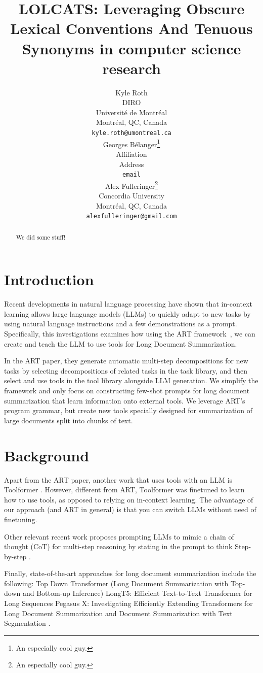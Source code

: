 \documentclass{article}
\title{LOLCATS: Leveraging Obscure Lexical Conventions And Tenuous Synonyms in computer science research}
\author{%
  Kyle Roth \\
  DIRO \\
  Université de Montréal \\
  Montréal, QC, Canada \\
  \texttt{kyle.roth@umontreal.ca} \\
  \And
  Georges Bélanger\thanks{An especially cool guy.} \\
  Affiliation \\
  Address \\
  \texttt{email} \\
  \And
  Alex Fulleringer\thanks{An especially cool guy.} \\
  Concordia University \\
  Montréal, QC, Canada \\
  \texttt{alexfulleringer@gmail.com} \\
}
\begin{document}
\maketitle


\begin{abstract}
  We did some stuff!
\end{abstract}


\section{Introduction}
Recent developments in natural language processing have shown that in-context learning allows large language models (LLMs) to quickly adapt to new tasks by using natural language instructions and a few demonstrations as a prompt.
Specifically, this investigations examines how using the ART framework~\cite{paranjape2023art}, we can create and teach the LLM to use tools for Long Document Summarization.

In the ART paper, they generate automatic multi-step decompositions for new tasks by selecting decompositions of related tasks in the task library, and then select and use tools in the tool library alongside LLM generation.
We simplify the framework and only focus on constructing few-shot prompts for long document summarization that learn information onto external tools. We leverage ART's program grammar, but create new tools specially designed for summarization of large documents split into chunks of text.


\section{Background}
Apart from the ART paper, another work that uses tools with an LLM is Toolformer .
However, different from ART, Toolformer was finetuned to learn how to use tools, as opposed to relying on in-context learning. The advantage of our approach (and ART in general) is that you can switch LLMs without need of finetuning.

Other relevant recent work proposes prompting LLMs to mimic a chain of thought (CoT) for multi-step reasoning by stating in the prompt to think Step-by-step .

Finally, state-of-the-art approaches for long document summarization include the following:
Top Down Transformer (Long Document Summarization with Top-down and Bottom-up Inference)
LongT5: Efficient Text-to-Text Transformer for Long Sequences
Pegasus X: Investigating Efficiently Extending Transformers for Long Document Summarization and Document Summarization with Text Segmentation \add{\cite}.
\end{document}
